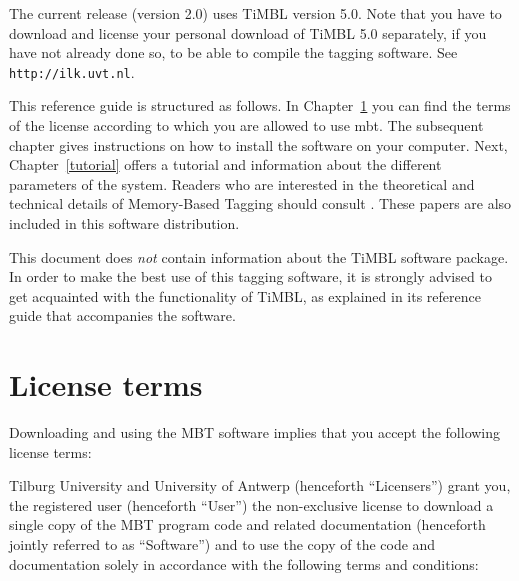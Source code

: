 \documentclass{report}
\begin{document}
The current release (version 2.0) uses TiMBL version 5.0. Note that
you have to download and license your personal download of TiMBL 5.0
separately, if you have not already done so, to be able to compile the
tagging software. See {\tt http://ilk.uvt.nl}.

This reference guide is structured as follows. In
Chapter~\ref{license} you can find the terms of the license according
to which you are allowed to use {\sc mbt}. The subsequent chapter
gives instructions on how to install the software on your computer.
Next, Chapter~\ref{tutorial} offers a tutorial and information about
the different parameters of the system.  Readers who are interested in
the theoretical and technical details of Memory-Based Tagging should
consult \cite{Daelemans+96,Zavrel+99}. These papers are also included
in this software distribution.

This document does {\em not} contain information about the TiMBL
software package. In order to make the best use of this tagging
software, it is strongly advised to get acquainted with the
functionality of TiMBL, as explained in its reference guide that
accompanies the software.

\chapter{License terms}
\label{license}

Downloading and using the MBT software implies that you accept the
following license terms:

Tilburg University and University of Antwerp (henceforth
``Licensers'') grant you, the registered user (henceforth ``User'')
the non-exclusive license to download a single copy of the MBT
program code and related documentation (henceforth jointly referred to
as ``Software'') and to use the copy of the code and documentation
solely in accordance with the following terms and conditions:
\end{document}
